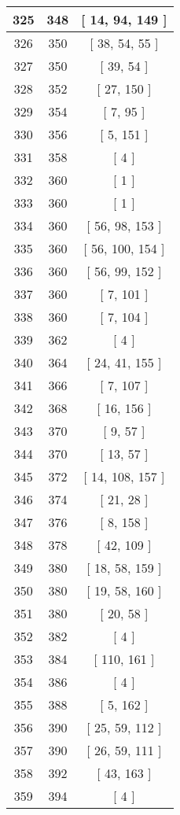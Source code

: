 \begin{center}
\begin{longtable}[H]{|| c c c ||}
\hline
325 & 348 & [ 14, 94, 149 ] \\ 
\hline
326 & 350 & [ 38, 54, 55 ] \\ 
\hline
327 & 350 & [ 39, 54 ] \\ 
\hline
328 & 352 & [ 27, 150 ] \\ 
\hline
329 & 354 & [ 7, 95 ] \\ 
\hline
330 & 356 & [ 5, 151 ] \\ 
\hline
331 & 358 & [ 4 ] \\ 
\hline
332 & 360 & [ 1 ] \\ 
\hline
333 & 360 & [ 1 ] \\ 
\hline
334 & 360 & [ 56, 98, 153 ] \\ 
\hline
335 & 360 & [ 56, 100, 154 ] \\ 
\hline
336 & 360 & [ 56, 99, 152 ] \\ 
\hline
337 & 360 & [ 7, 101 ] \\ 
\hline
338 & 360 & [ 7, 104 ] \\ 
\hline
339 & 362 & [ 4 ] \\ 
\hline
340 & 364 & [ 24, 41, 155 ] \\ 
\hline
341 & 366 & [ 7, 107 ] \\ 
\hline
342 & 368 & [ 16, 156 ] \\ 
\hline
343 & 370 & [ 9, 57 ] \\ 
\hline
344 & 370 & [ 13, 57 ] \\ 
\hline
345 & 372 & [ 14, 108, 157 ] \\ 
\hline
346 & 374 & [ 21, 28 ] \\ 
\hline
347 & 376 & [ 8, 158 ] \\ 
\hline
348 & 378 & [ 42, 109 ] \\ 
\hline
349 & 380 & [ 18, 58, 159 ] \\ 
\hline
350 & 380 & [ 19, 58, 160 ] \\ 
\hline
351 & 380 & [ 20, 58 ] \\ 
\hline
352 & 382 & [ 4 ] \\ 
\hline
353 & 384 & [ 110, 161 ] \\ 
\hline
354 & 386 & [ 4 ] \\ 
\hline
355 & 388 & [ 5, 162 ] \\ 
\hline
356 & 390 & [ 25, 59, 112 ] \\ 
\hline
357 & 390 & [ 26, 59, 111 ] \\ 
\hline
358 & 392 & [ 43, 163 ] \\ 
\hline
359 & 394 & [ 4 ] \\ 

\end{longtable}
\end{center}

